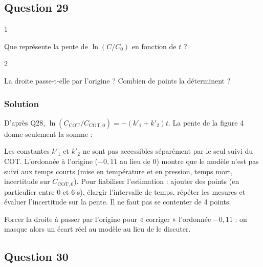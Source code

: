 \documentclass[11pt,a4paper]{article}
\newcommand{\equationajustee}[1]{%
  \sbox{\boiteequation}{$\displaystyle #1$}%
  \ifdim\wd\boiteequation>\linewidth
    \[\resizebox{\linewidth}{!}{\usebox{\boiteequation}}\]%
  \else
    \[#1\]%
  \fi}
\begin{document}
\hypertarget{question-29}{%
\subsection{Question 29}\label{question-29}}

\begin{indication}{1}

Que représente la pente de \(\ln(C/C_0)\) en fonction de \(t\) ?

\end{indication}

\begin{indication}{2}

La droite passe-t-elle par l'origine ? Combien de points la déterminent ?

\end{indication}

\hypertarget{solution-28}{%
\subsubsection{Solution}\label{solution-28}}

D'après Q28, \(\ln(C_{\mathrm{COT}}/C_{\mathrm{COT},0})=-(k'_1+k'_2)t\). La pente de la figure 4 donne seulement la somme :

\equationajustee{\boxed{k'_1+k'_2\approx0{,}15\ \mathrm{s^{-1}}\ \text{\text{à} }450\ \text{°C}}}

Les constantes \(k'_1\) et \(k'_2\) ne sont pas accessibles séparément par le seul suivi du COT. L'ordonnée à l'origine (\(-0{,}11\) au lieu de 0) montre que le modèle n'est pas suivi aux temps courts (mise en température et en pression, temps mort, incertitude sur \(C_{\mathrm{COT},0}\)). Pour fiabiliser l'estimation : ajouter des points (en particulier entre 0 et 6 s), élargir l'intervalle de temps, répéter les mesures et évaluer l'incertitude sur la pente. Il ne faut pas se contenter de 4 points.

\begin{piege}

Forcer la droite à passer par l'origine pour « corriger » l'ordonnée \(-0{,}11\) : on masque alors un écart réel au modèle au lieu de le discuter.

\end{piege}

\hypertarget{question-30}{%
\subsection{Question 30}\label{question-30}}
\end{document}
